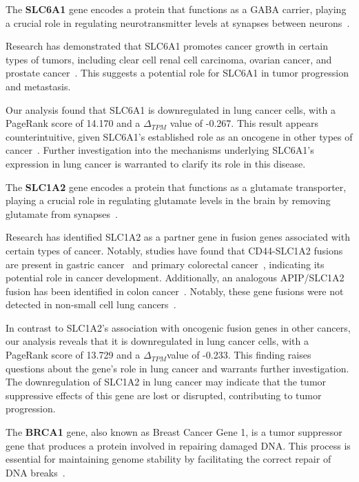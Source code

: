 The \textbf{SLC6A1} gene encodes a protein that functions as a GABA carrier,
playing a crucial role in regulating neurotransmitter levels at synapses between neurons~\cite{Chen2020SLC6A1}.

Research has demonstrated that SLC6A1 promotes cancer growth in certain types of tumors,
including clear cell renal cell carcinoma, ovarian cancer, and prostate cancer~\cite{Chen2020SLC6A1}.
This suggests a potential role for SLC6A1 in tumor progression and metastasis.

Our analysis found that SLC6A1 is downregulated in lung cancer cells,
with a PageRank score of 14.170 and a $\Delta_{TPM}$ value of -0.267.
This result appears counterintuitive, given SLC6A1's established role as an oncogene in other types of cancer~\cite{Chen2020SLC6A1}.
Further investigation into the mechanisms underlying SLC6A1's expression in lung cancer is warranted to clarify its role in this disease.
\newline

The \textbf{SLC1A2} gene encodes a protein that functions as a glutamate transporter,
playing a crucial role in regulating glutamate levels in the brain by removing glutamate from synapses~\cite{NCBI2017SLC1A2}.

Research has identified SLC1A2 as a partner gene in fusion genes associated with certain types of cancer.
Notably, studies have found that CD44-SLC1A2 fusions are present in gastric cancer~\cite{Tao2011CD44} and
primary colorectal cancer~\cite{Shinmura2015CD44}, indicating its potential role in cancer development.
Additionally, an analogous APIP/SLC1A2 fusion has been identified in colon cancer~\cite{Giacomini2013Breakpoint}.
Notably, these gene fusions were not detected in non-small cell lung cancers~\cite{Shinmura2015CD44}.

In contrast to SLC1A2's association with oncogenic fusion genes in other cancers,
our analysis reveals that it is downregulated in lung cancer cells,
with a PageRank score of 13.729 and a $\Delta_{TPM}$value of -0.233.
This finding raises questions about the gene's role in lung cancer and warrants further investigation.
The downregulation of SLC1A2 in lung cancer may indicate that the tumor suppressive effects of this gene are lost or disrupted,
contributing to tumor progression.
\newline

The \textbf{BRCA1} gene, also known as Breast Cancer Gene 1, is a tumor suppressor gene
that produces a protein involved in repairing damaged DNA\@.
This process is essential for maintaining genome stability by facilitating the correct repair of DNA breaks~\cite{NCI2020BRCA1}.

